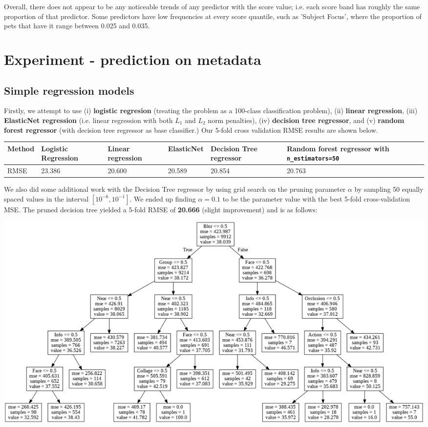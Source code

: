 \documentclass[12pt]{article}
\begin{document}
Overall, there does not appear to be any noticeable trends of any predictor with the score value; i.e. each score band has roughly the same proportion of that predictor. Some predictors have low frequencies at every score quantile, such as 'Subject Focus', where the proportion of pets that have it range between 0.025 and 0.035.

\section{Experiment - prediction on metadata}

\subsection{Simple regression models}

Firstly, we attempt to use (i) \textbf{logistic regresion} (treating the problem as a 100-class classification problem), (ii) \textbf{linear regression}, (iii) \textbf{ElasticNet regression} (i.e. linear regression with both $L_1$ and $L_2$ norm penalties), (iv) \textbf{decision tree regressor}, and (v) \textbf{random forest regressor} (with decision tree regressor as base classifier.) Our 5-fold cross validation RMSE results are shown below.\newline

\begin{center}
\begin{tabular}{ | m{1.2cm} | m{3cm}| m{3cm} | m{2cm} | m{3cm} | m{3cm} | } 
  \hline
  Method & Logistic Regression & Linear regression & ElasticNet & Decision Tree regressor & Random forest regressor with \texttt{n\_estimators=50}\\ 
  \hline
  RMSE & 23.386 & 20.600 & 20.589 & 20.854 & 20.763 \\ 
  \hline
\end{tabular}
\end{center}

We also did some additional work with the Decision Tree regressor by using grid search on the pruning parameter $\alpha$ by sampling 50 equally spaced values in the interval $[10^{-6}, 10^{-1}]$. We ended up finding $\alpha=0.1$ to be the parameter value with the best 5-fold cross-validation MSE. The pruned decision tree yielded a 5-fold RMSE of \textbf{20.666} (slight improvement) and is as follows:

\includegraphics[scale=0.2]{4_prunedtree}
\end{document}
